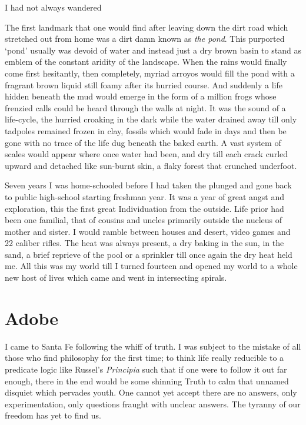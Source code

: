 \documentclass[ebook, 11pt, openright, onecolumn]{memoir}
\begin{document}
I had not always wandered

The first landmark that one would find after leaving down the dirt road which
stretched out from home was a dirt damn known as \textit{the pond}.  This
purported `pond' usually was devoid of water and instead just a dry brown basin
to stand as emblem of the constant aridity of the landscape.  When the rains
would finally come first hesitantly, then completely, myriad arroyos would fill
the pond with a fragrant brown liquid still foamy after its hurried course.  And
suddenly a life hidden beneath the mud would emerge in the form of a million
frogs whose frenzied calls could be heard through the walls at night.  It was
the sound of a life-cycle, the hurried croaking in the dark while the water
drained away till only tadpoles remained frozen in clay, fossils which would
fade in days and then be gone with no trace of the life dug beneath the baked
earth.  A vast system of scales would appear where once water had been, and dry
till each crack curled upward and detached like sun-burnt skin, a flaky forest
that crunched underfoot.

Seven years I was home-schooled before I had taken the plunged and gone back to
public high-school starting freshman year.  It was a year of great angst and
exploration, this the first great Individuation from the outside.  Life prior
had been one familial, that of cousins and uncles primarily outside the nucleus
of mother and sister.  I would ramble between houses and desert, video games and
22 caliber rifles.  The heat was always present, a dry baking in the sun, in the
sand, a brief reprieve of the pool or a sprinkler till once again the dry heat
held me.  All this was my world till I turned fourteen and opened my world to a
whole new host of lives which came and went in intersecting spirals.  



\chapter{Adobe}
\label{cha:adobe}
I came to Santa Fe following the whiff of truth.  I was subject to the mistake
of all those who find philosophy for the first time; to think life really
reducible to a predicate logic like Russel's \textit{Principia} such that if one
were to follow it out far enough, there in the end would be some shinning Truth
to calm that unnamed disquiet which pervades youth.  One cannot yet accept there
are no answers, only experimentation, only questions fraught with unclear
answers.  The tyranny of our freedom has yet to find us.
\end{document}
